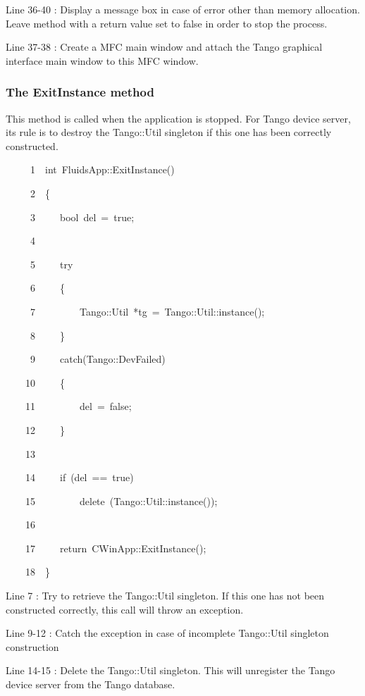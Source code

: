 Line 36-40 : Display a message box in case of error other than memory
allocation. Leave method with a return value set to false in order
to stop the process.

Line 37-38 : Create a MFC main window and attach the Tango
graphical interface main window to this MFC window.


\subsubsection{The ExitInstance method}

This method is called when the application is stopped. For Tango device
server, its rule is to destroy the Tango::Util singleton if this one
has been correctly constructed.


\begin{lyxcode}
~~~~~1~~int~FluidsApp::ExitInstance()

~~~~~2~~\{

~~~~~3~~~~~bool~del~=~true;

~~~~~4~~

~~~~~5~~~~~try

~~~~~6~~~~~\{

~~~~~7~~~~~~~~~Tango::Util~{*}tg~=~Tango::Util::instance();

~~~~~8~~~~~\}

~~~~~9~~~~~catch(Tango::DevFailed)

~~~~10~~~~~\{

~~~~11~~~~~~~~~del~=~false;

~~~~12~~~~~\}

~~~~13~~

~~~~14~~~~~if~(del~==~true)

~~~~15~~~~~~~~~delete~(Tango::Util::instance());

~~~~16~~

~~~~17~~~~~return~CWinApp::ExitInstance();

~~~~18~~\}
\end{lyxcode}


Line 7 : Try to retrieve the Tango::Util singleton. If this one has
not been constructed correctly, this call will throw an exception.

Line 9-12 : Catch the exception in case of incomplete Tango::Util
singleton construction

Line 14-15 : Delete the Tango::Util singleton. This will unregister
the Tango device server from the Tango database.

